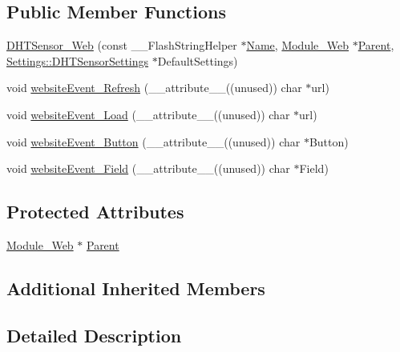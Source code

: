\subsection*{Public Member Functions}
\begin{DoxyCompactItemize}
\item 
\hyperlink{class_d_h_t_sensor___web_a422e637e9933551dd4bd85609d1d20bd}{D\+H\+T\+Sensor\+\_\+\+Web} (const \+\_\+\+\_\+\+Flash\+String\+Helper $\ast$\hyperlink{class_common_aeea91a726dbe988e515057b32ba0726f}{Name}, \hyperlink{class_module___web}{Module\+\_\+\+Web} $\ast$\hyperlink{class_d_h_t_sensor___web_a5978d2c472c63dca58e9f9c83cc27ef0}{Parent}, \hyperlink{struct_settings_1_1_d_h_t_sensor_settings}{Settings\+::\+D\+H\+T\+Sensor\+Settings} $\ast$Default\+Settings)
\item 
void \hyperlink{class_d_h_t_sensor___web_ad02a0f5edd3f948ae81f9ebe6032d443}{website\+Event\+\_\+\+Refresh} (\+\_\+\+\_\+attribute\+\_\+\+\_\+((unused)) char $\ast$url)
\item 
void \hyperlink{class_d_h_t_sensor___web_ab28dae39325e2256be5c0c4505149afe}{website\+Event\+\_\+\+Load} (\+\_\+\+\_\+attribute\+\_\+\+\_\+((unused)) char $\ast$url)
\item 
void \hyperlink{class_d_h_t_sensor___web_aad3323a4869c3cf99d7c5e257b487867}{website\+Event\+\_\+\+Button} (\+\_\+\+\_\+attribute\+\_\+\+\_\+((unused)) char $\ast$Button)
\item 
void \hyperlink{class_d_h_t_sensor___web_a1bd32356da7d365f165a05475fcc1877}{website\+Event\+\_\+\+Field} (\+\_\+\+\_\+attribute\+\_\+\+\_\+((unused)) char $\ast$Field)
\end{DoxyCompactItemize}
\subsection*{Protected Attributes}
\begin{DoxyCompactItemize}
\item 
\hyperlink{class_module___web}{Module\+\_\+\+Web} $\ast$ \hyperlink{class_d_h_t_sensor___web_a5978d2c472c63dca58e9f9c83cc27ef0}{Parent}
\end{DoxyCompactItemize}
\subsection*{Additional Inherited Members}


\subsection{Detailed Description}


